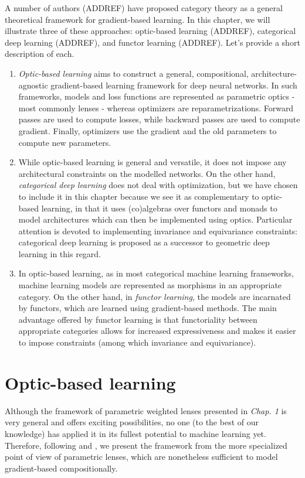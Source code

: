 \documentclass[12pt,a4paper,openright,twoside]{report}
\theoremstyle{plain}
\theoremstyle{definition}
\begin{document}
A number of authors (ADDREF) have proposed category theory as a general theoretical framework for gradient-based learning. In this chapter, we will illustrate three of these approaches: optic-based learning (ADDREF), categorical deep learning (ADDREF), and functor learning (ADDREF). Let's provide a short description of each.
\begin{enumerate}
  \item \textit{Optic-based learning} aims to construct a general, compositional, architecture-agnostic gradient-based learning framework for deep neural networks. In such frameworks, models and loss functions are represented as parametric optics -  most commonly lenses - whereas optimizers are reparametrizations. Forward passes are used to compute losses, while backward passes are used to compute gradient. Finally, optimizers use the gradient and the old parameters to compute new parameters.
  \item While optic-based learning is general and versatile, it does not impose any architectural constraints on the modelled networks. On the other hand, \textit{categorical deep learning} does not deal with optimization, but we have chosen to include it in this chapter because we see it as complementary to optic-based learning, in that it uses (co)algebras over functors and monads to model architectures which can then be implemented using optics. Particular attention is devoted to implementing invariance and equivariance constraints: categorical deep learning is proposed as a successor to geometric deep learning in this regard.
  \item In optic-based learning, as in most categorical machine learning frameworks, machine learning models are represented as morphisms in an appropriate category. On the other hand, in \textit{functor learning}, the models are incarnated by functors, which are learned using gradient-based methods. The main advantage offered by functor learning is that functoriality between appropriate categories allows for increased expressiveness and makes it easier to impose constraints (among which invariance and equivariance). 
\end{enumerate}

\section{Optic-based learning}

Although the framework of parametric weighted lenses presented in \textit{Chap. 1} is very general and offers exciting possibilities, no one (to the best of our knowledge) has applied it in its fullest potential to machine learning yet. Therefore, following \cite{gavranovic2024fundamental} and \cite{cruttwell2022categorical}, we present the framework from the more specialized point of view of parametric lenses, which are nonetheless sufficient to model gradient-based compositionally.
\end{document}
